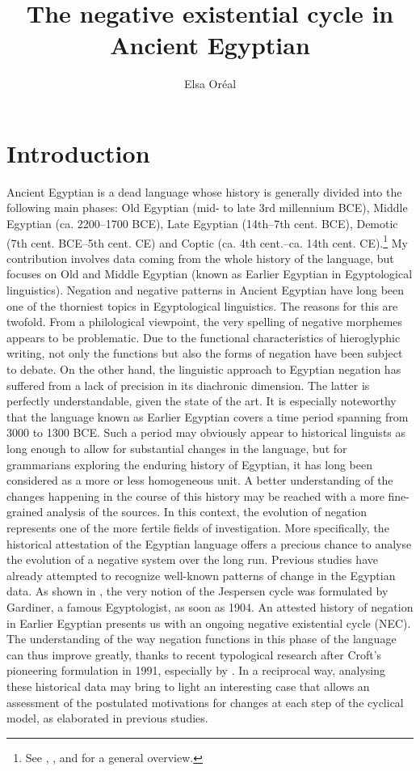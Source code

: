 \documentclass[output=paper]{langsci/langscibook}
\author{Elsa Oréal\affiliation{French National Centre for Scientific Research}}
\title{The negative existential cycle in Ancient Egyptian}
\newcommand{\ꜥ}{ʿ}
\newcommand{\ꜣ}{\kern-.25pt\texttt{ꜣ}\kern-.6pt}
\begin{document}
\maketitle

\todo{check \ꜥ{} and \ꜣ}
\section{Introduction}\label{s:AE1}
Ancient Egyptian is a dead language whose history is generally divided into the following main phases: Old Egyptian (mid- to late 3rd millennium BCE), Middle Egyptian (ca. 2200–1700 BCE), Late Egyptian (14th–7th cent. BCE), Demotic (7th cent. BCE–5th cent. CE) and Coptic (ca. 4th cent.–ca. 14th cent. CE).\footnote{See \citet{Loprieno1995}, \citet{LoprienoMuller2012}, and \citet{GrossmanRichter} for a general overview.} My contribution involves data coming from the whole history of the language, but focuses on Old and Middle Egyptian (known as Earlier Egyptian in Egyptological linguistics). Negation and negative patterns in Ancient Egyptian have long been one of the thorniest topics in Egyptological linguistics. The reasons for this are twofold. From a philological viewpoint, the very spelling of negative morphemes appears to be problematic. Due to the functional characteristics of hieroglyphic writing, not only the functions but also the forms of negation have been subject to debate. On the other hand, the linguistic approach to Egyptian negation has suffered from a lack of precision in its diachronic dimension. The latter is perfectly understandable, given the state of the art. It is especially noteworthy that the language known as Earlier Egyptian covers a time period spanning from 3000 to 1300 BCE. Such a period may obviously appear to historical linguists as long enough to allow for substantial changes in the language, but for grammarians exploring the enduring history of Egyptian, it has long been considered as a more or less homogeneous unit. A better understanding of the changes happening in the course of this history may be reached with a more fine-grained analysis of the sources. In this context, the evolution of negation represents one of the more fertile fields of investigation. More specifically, the historical attestation of the Egyptian language offers a precious chance to analyse the evolution of a negative system over the long run. Previous studies have already attempted to recognize well-known patterns of change in the Egyptian data. As shown in \cite{vanderAuwera2009}, the very notion of the Jespersen cycle was formulated by Gardiner, a famous Egyptologist, as soon as 1904. An attested history of negation in Earlier Egyptian presents us with an ongoing negative existential cycle (NEC). The understanding of the way negation functions in this phase of the language can thus improve greatly, thanks to recent typological research after Croft’s pioneering formulation in 1991, especially by \citet{Veselinova2013, Veselinova2014, Veselinova2016}. In a reciprocal way, analysing these historical data may bring to light an interesting case that allows an assessment of the postulated motivations for changes at each step of the cyclical model, as elaborated in previous studies.
\end{document}
